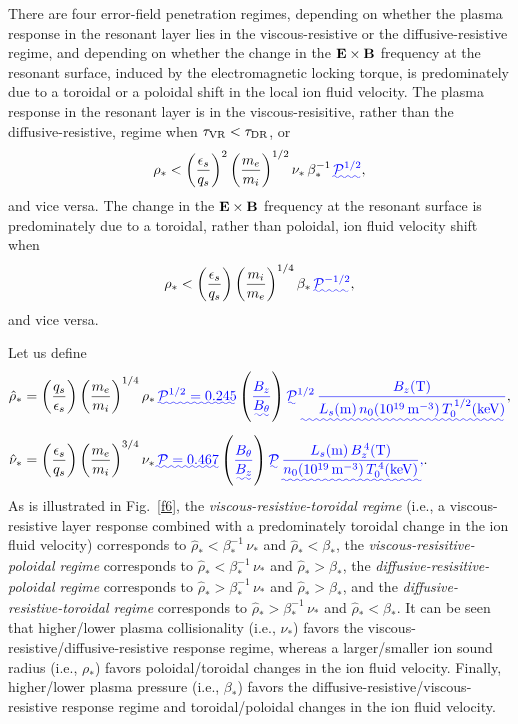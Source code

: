 \documentclass[12pt,prb,aps]{revtex4-1}
\providecommand{\DIFadd}[1]{{\protect\color{blue}\uwave{#1}}} %
\providecommand{\DIFaddbegin}{} %
\providecommand{\DIFaddend}{} %
\begin{document}
There are four error-field penetration regimes, depending on whether the plasma response in the resonant layer lies 
in the viscous-resistive or the diffusive-resistive regime, and depending on whether the change in the ${\bf E}\times{\bf B}$
frequency at the resonant surface, induced by the electromagnetic locking torque,  is
predominately due to a toroidal or a poloidal shift in the local ion fluid velocity. The plasma response in the resonant layer is in the
viscous-resisitive, rather than the diffusive-resistive, regime when $\tau_{\rm VR}<\tau_{\rm DR}$, or
\begin{equation}
\rho_\ast < \left(\frac{\epsilon_s}{q_s}\right)^2\left(\frac{m_e}{m_i}\right)^{1/2}\nu_\ast\,\beta_\ast^{-1}\DIFaddbegin \DIFadd{\,{\cal P}^{1/2}}\DIFaddend ,
\end{equation}
and vice versa. The change in the ${\bf E}\times{\bf B}$ frequency at the resonant surface is predominately due to a toroidal, rather than poloidal, ion fluid velocity shift when
\begin{equation}
\rho_\ast < \left(\frac{\epsilon_s}{q_s}\right)\left(\frac{m_i}{m_e}\right)^{1/4}\beta_\ast\DIFaddbegin \DIFadd{\,{\cal P}^{-1/2}}\DIFaddend ,
\end{equation}
and vice versa. 

Let us define 
\begin{align}
\hat{\rho}_\ast&= \left(\frac{q_s}{\epsilon_s}\right)\left(\frac{m_e}{m_i}\right)^{1/4}\rho_\ast\DIFaddbegin \DIFadd{\,{\cal P}^{1/2}= 0.245}\left(\DIFadd{\frac{B_z}{B_\theta}}\right)
{\cal \DIFadd{P}}\DIFadd{^{1/2}\,\frac{B_z({\rm T})}{L_s({\rm m})\,n_0(10^{19}\,{\rm m}^{-3})\,T_0^{\,1/2}({\rm keV})}}\DIFaddend ,
\\[0.5ex]
\hat{\nu}_\ast&=\left(\frac{\epsilon_s}{q_s}\right)\left(\frac{m_e}{m_i}\right)^{3/4}\nu_\ast\DIFaddbegin \DIFadd{\,{\cal P}= 0.467}\left(\DIFadd{\frac{B_\theta}{B_z}}\right)
{\cal \DIFadd{P}}\DIFadd{\,\frac{L_s({\rm m})\,B_z^{\,4}({\rm T})}{n_0(10^{19}\,{\rm m}^{-3})\,T_0^{\,4}({\rm keV})},}\DIFaddend .
\end{align}
As is illustrated in Fig.~\ref{f6}, the {\em viscous-resistive-toroidal regime}\/ (i.e., a viscous-resistive layer response
combined with a predominately toroidal change in the ion fluid velocity) corresponds to $\hat{\rho}_\ast < \beta_\ast^{-1}\,\nu_\ast$ 
and $\hat{\rho}_\ast <\beta_\ast$, the {\em viscous-resisitive-poloidal regime}\/ corresponds to 
 $\hat{\rho}_\ast<\beta_\ast^{-1}\,\nu_\ast$ and $\hat{\rho}_\ast > \beta_\ast$, the {\em diffusive-resisitive-poloidal regime}\/ corresponds to  
 $\hat{\rho}_\ast>\beta_\ast^{-1}\,\nu_\ast$ and $\hat{\rho}_\ast > \beta_\ast$, and the {\em diffusive-resistive-toroidal regime}\/ corresponds to   
 $\hat{\rho}_\ast>\beta_\ast^{-1}\,\nu_\ast$ and $\hat{\rho}_\ast < \beta_\ast$.
It can be seen that higher/lower plasma collisionality (i.e., $\nu_\ast$) favors the viscous-resistive/diffusive-resistive response regime, whereas a
larger/smaller ion sound radius (i.e., $\rho_\ast$) favors poloidal/toroidal changes in the ion fluid velocity. Finally, higher/lower plasma
pressure (i.e., $\beta_\ast$) 
favors the diffusive-resistive/viscous-resistive response regime and toroidal/poloidal changes in the ion fluid velocity. 
\end{document}
